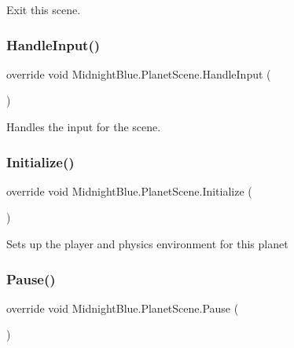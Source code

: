 Exit this scene. 

\hypertarget{class_midnight_blue_1_1_planet_scene_a6c84a639f27b9f7510b514969d47d1bd}{}\label{class_midnight_blue_1_1_planet_scene_a6c84a639f27b9f7510b514969d47d1bd} 
\subsubsection{\texorpdfstring{Handle\+Input()}{HandleInput()}}
{\footnotesize\ttfamily override void Midnight\+Blue.\+Planet\+Scene.\+Handle\+Input (\begin{DoxyParamCaption}{ }\end{DoxyParamCaption})\hspace{0.3cm}{\ttfamily [inline]}}



Handles the input for the scene. 

\hypertarget{class_midnight_blue_1_1_planet_scene_ac8b7e88283b22b87aa45f116b549e86f}{}\label{class_midnight_blue_1_1_planet_scene_ac8b7e88283b22b87aa45f116b549e86f} 
\subsubsection{\texorpdfstring{Initialize()}{Initialize()}}
{\footnotesize\ttfamily override void Midnight\+Blue.\+Planet\+Scene.\+Initialize (\begin{DoxyParamCaption}{ }\end{DoxyParamCaption})\hspace{0.3cm}{\ttfamily [inline]}}



Sets up the player and physics environment for this planet 

\hypertarget{class_midnight_blue_1_1_planet_scene_abc077e1cd5f40879ca3af4224f0ff455}{}\label{class_midnight_blue_1_1_planet_scene_abc077e1cd5f40879ca3af4224f0ff455} 
\subsubsection{\texorpdfstring{Pause()}{Pause()}}
{\footnotesize\ttfamily override void Midnight\+Blue.\+Planet\+Scene.\+Pause (\begin{DoxyParamCaption}{ }\end{DoxyParamCaption})\hspace{0.3cm}{\ttfamily [inline]}}



